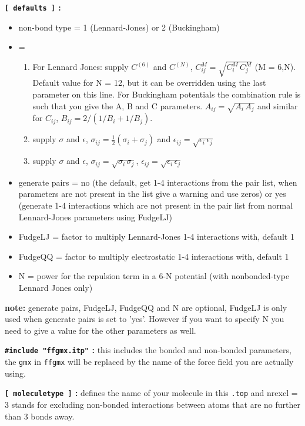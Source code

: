 {\bf {\tt [~defaults~]} :}
\begin{itemize}
\item non-bond type = 1 (Lennard-Jones) or 2 (Buckingham)\\
\item {} = 
\begin{enumerate}
\item For Lennard Jones: supply $C^{(6)}$ and $C^{(N)}$,
$C^{M}_{ij}=\sqrt{C^M_i\,C^M_j}$ (M = 6,N). 
Default value for N = 12, but it can be
overridden using the last parameter on this line.
For Buckingham potentials the combination rule is such that you give the
A, B and C parameters. $A_{ij} = \sqrt{A_i\, A_j}$ and similar for 
$C_{ij}$, $B_{ij} = 2/(1/B_i + 1/B_j)$.
\item supply $\sigma$ and $\epsilon$,
$\sigma_{ij}=\frac{1}{2}(\sigma_i+\sigma_j)$ and 
$\epsilon_{ij}=\sqrt{\epsilon_i\,\epsilon_j}$
\item supply $\sigma$ and $\epsilon$, $\sigma_{ij}=\sqrt{\sigma_i\,\sigma_j}$,
$\epsilon_{ij}=\sqrt{\epsilon_i\,\epsilon_j}$
\end{enumerate}
\item generate pairs = no
(the default, get 1-4 interactions from the pair list, when parameters
are not present in the list give a warning and use zeros)
or yes (generate 1-4 interactions which are not present in the pair list
from normal Lennard-Jones parameters using FudgeLJ)
\item FudgeLJ = factor to multiply Lennard-Jones 1-4 interactions with, default 1
\item FudgeQQ = factor to multiply electrostatic 1-4 interactions with, default 1
\item N = power for the repulsion term in a 6-N potential (with 
nonbonded-type Lennard Jones only)
\end{itemize}
{\bf note:} generate pairs, FudgeLJ, FudgeQQ and N are optional,
FudgeLJ is only used when generate pairs is set to 'yes'. However if you
want to specify N you need to give a value for the other parameters as well.

%

{\bf {\tt \#include "ffgmx.itp"} :} this includes the bonded and
non-bonded {\gromacs} parameters, the {\tt gmx} in {\tt ffgmx} will be
replaced by the name of the force field you are actually using.

{\bf {\tt [~moleculetype~]} :} defines the name of your molecule in
this {\tt *.top} and nrexcl = 3 stands for excluding non-bonded
interactions between atoms that are no further than 3 bonds away.

